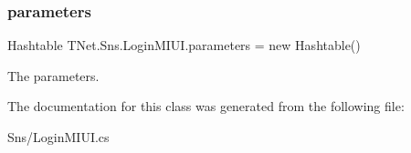 \subsubsection{\texorpdfstring{parameters}{parameters}}
{\footnotesize\ttfamily Hashtable T\+Net.\+Sns.\+Login\+M\+I\+U\+I.\+parameters = new Hashtable()\hspace{0.3cm}{\ttfamily [protected]}}



The parameters. 



The documentation for this class was generated from the following file\+:\begin{DoxyCompactItemize}
\item 
Sns/Login\+M\+I\+U\+I.\+cs\end{DoxyCompactItemize}

